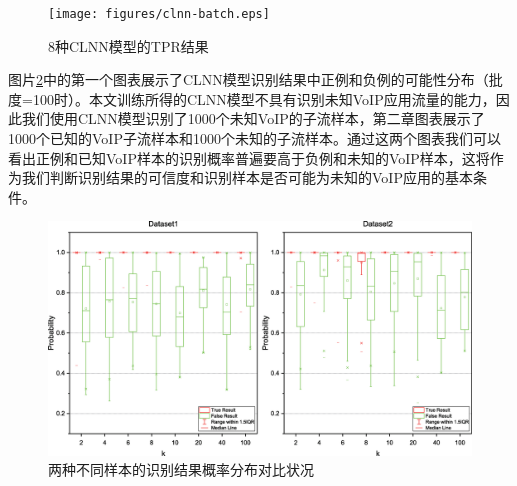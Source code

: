 
\begin{figure}[htp]
\begin{center}
\texttt{[image: figures/clnn-batch.eps]}
\caption{8种CLNN模型的TPR结果}\label{fig:clnn-batch}
\end{center}
\end{figure}

图片\ref{fig:tf}中的第一个图表展示了CLNN模型识别结果中正例和负例的可能性分布（批度=100时）。本文训练所得的CLNN模型不具有识别未知VoIP应用流量的能力，因此我们使用CLNN模型识别了1000个未知VoIP的子流样本，第二章图表展示了1000个已知的VoIP子流样本和1000个未知的子流样本。通过这两个图表我们可以看出正例和已知VoIP样本的识别概率普遍要高于负例和未知的VoIP样本，这将作为我们判断识别结果的可信度和识别样本是否可能为未知的VoIP应用的基本条件。


\begin{figure}[htp]
\begin{center}
\includegraphics[width=1\textwidth]{figures/tf.eps}
\caption{两种不同样本的识别结果概率分布对比状况}\label{fig:tf}
\end{center}
\end{figure}

